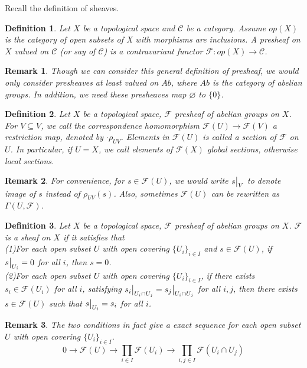 \documentclass{ctexart}
\newtheorem{definition}{Definition}[section]
\newtheorem{remark}{Remark}[section]
\begin{document}
Recall the definition of sheaves.
\begin{definition}
    Let $X$ be a topological space and $\mathcal{C}$ be a category.
    Assume $op(X)$ is the category of open subsets of X with morphisms are inclusions.
    A presheaf on $X$ valued on $\mathcal{C}$ (or say of $\mathcal{C}$) is a contravariant functor $\mathcal{F}: op(X) \longrightarrow \mathcal{C}$.
\end{definition}
\begin{remark}
    Though we can consider this general definition of presheaf, we would only consider presheaves at least valued on $Ab$,
    where $Ab$ is the category of abelian groups.
    In addition, we need these presheaves map $\varnothing$ to $\{0\}$.
\end{remark}
\begin{definition}
    Let $X$ be a topological space, $\mathcal{F}$ presheaf of abelian groups on $X$.
    For $V \subseteq V$, we call the correspondence homomorphism $\mathcal{F}(U) \longrightarrow \mathcal{F}(V)$ a restriction map, denoted by $\cdot \rho_{UV}$.
    Elements in $\mathcal{F}(U)$ is called a section of $\mathcal{F}$ on $U$.
    In particular, if $U = X$, we call elements of $\mathcal{F}(X)$ global sections, otherwise local sections.
\end{definition}
\begin{remark}
    For convenience, for $s\in \mathcal{F}(U)$, we would write $s\big{|}_V$ to denote image of $s$ instead of $\rho_{UV}(s)$.
    Also, sometimes $\mathcal{F}(U)$ can be rewritten as $\Gamma(U, \mathcal{F})$.
\end{remark}
\begin{definition}
    Let $X$ be a topological space, $\mathcal{F}$ presheaf of abelian groups on $X$.
    $\mathcal{F}$ is a sheaf on $X$ if it satisfies that \\
    (1)For each open subset $U$ with open covering $\{U_{i}\}_{i\in I}$ and $s\in \mathcal{F}(U)$, 
    if $s\big{|}_{U_{i}} = 0$ for all $i$, then $s = 0$. \\
    (2)For each open subset $U$ with open covering $\{U_{i}\}_{i\in I}$,
    if there exists $s_{i}\in \mathcal{F}(U_{i})$ for all $i$, satisfying $s_{i}\big{|}_{U_{i} \cap U_{j}} = s_{j}\big{|}_{U_{i} \cap U_{j}}$ for all $i,j$,
    then there exists $s\in \mathcal{F}(U)$ such that $s\big{|}_{U_{i}} = s_{i}$ for all $i$.
\end{definition}
\begin{remark}
    The two conditions in fact give a exact sequence for each open subset $U$ with open covering $\{U_{i}\}_{i\in I}$.
    \begin{equation*}
        0 \longrightarrow \mathcal{F}(U) \longrightarrow \prod_{i\in I} \mathcal{F}(U_{i}) \longrightarrow \prod_{i,j\in I} \mathcal{F}(U_{i} \cap U_{j})
    \end{equation*}
\end{remark}
\end{document}
